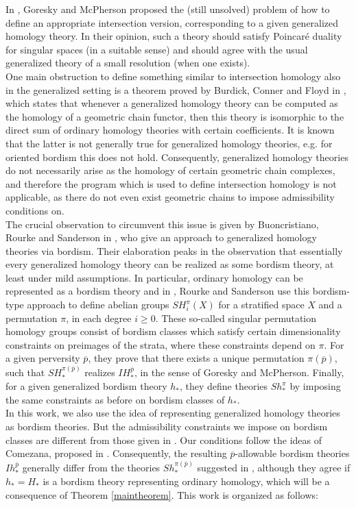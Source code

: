 \documentclass{scrreprt}
\begin{document}
In \cite{problemsIH}, Goresky and McPherson proposed the (still unsolved) problem of how to define an appropriate intersection version, corresponding to a given generalized homology theory. In their opinion, such a theory should satisfy Poincar\'{e} duality for singular spaces (in a suitable sense) and should agree with the usual generalized theory of a small resolution (when one exists). \\
One main obstruction to define something similar to intersection homology also in the generalized setting is a theorem proved by Burdick, Conner and Floyd in \cite{bcf}, which states that whenever a generalized homology theory can be computed as the homology of a geometric chain functor, then this theory is isomorphic to the direct sum of ordinary homology theories with certain coefficients. It is known that the latter is not generally true for generalized homology theories, e.g. for oriented bordism this does not hold. Consequently, generalized homology theories do not necessarily arise as the homology of certain geometric chain complexes, and therefore the program which is used to define intersection homology is not applicable, as there do not even exist geometric chains to impose admissibility conditions on. \\
The crucial observation to circumvent this issue is given by Buoncristiano, Rourke and Sanderson in \cite{BRS}, who give an approach to generalized homology theories via bordism. Their elaboration peaks in the observation that essentially every generalized homology theory can be realized as some bordism theory, at least under mild assumptions. In particular, ordinary homology can be represented as a bordism theory and in \cite{rourkestratifications}, Rourke and Sanderson use this bordism-type approach to define abelian groups $SH_i^{\pi}(X)$ for a stratified space $X$ and a permutation $\pi$, in each degree $i \geq 0$.  These so-called singular permutation homology groups consist of bordism classes which satisfy certain dimensionality constraints on preimages of the strata, where these constraints depend on $\pi$. For a given perversity $\overline{p}$, they prove that there exists a unique permutation $\pi(\overline{p})$, such that $SH_*^{\pi(\overline{p})}$ realizes $IH_*^{\overline{p}}$, in the sense of Goresky and McPherson. Finally, for a given generalized bordism theory $h_*$, they define theories $Sh_*^{\pi}$ by imposing the same constraints as before on bordism classes of $h_*$.\\
In this work, we also use the idea of representing generalized homology theories as bordism theories. But the admissibility constraints we impose on bordism classes are different from those given in \cite{rourkestratifications}. Our conditions follow the ideas of Comezana, proposed in \cite{comezana}.  Consequently, the resulting $\overline{p}$-allowable bordism theories $Ih_*^{\overline{p}}$ generally differ from the theories $Sh_*^{\pi(\overline{p})}$ suggested in \cite{rourkestratifications}, although they agree if $h_*=H_*$ is a bordism theory representing ordinary homology, which will be a consequence of Theorem \ref{maintheorem}. This work is organized as follows: \\
\end{document}
